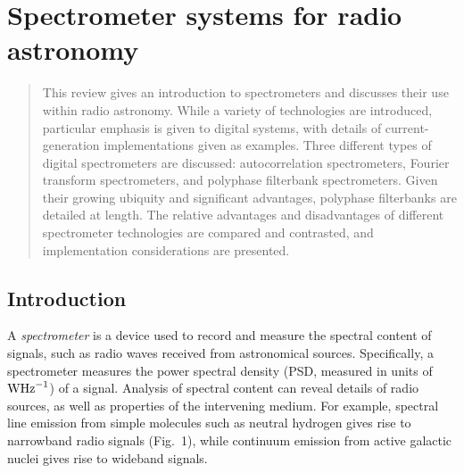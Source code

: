 \documentclass{ws-rv961x669}
\begin{document}
\chapter[Spectrometers]{Spectrometer systems for radio astronomy}\label{spec_chap}

\author[D. Price, J. Hickish and D. Werthimer]{Danny C. Price, Jack Hickish and Dan Werthimer}

\address{Campbell Hall 339, UC Berkeley\\
Address goes here, \\
dancpr@berkeley.edu}

\begin{abstract}
This review gives an introduction to spectrometers and discusses their use within radio astronomy. While a variety of technologies are introduced, particular emphasis is given to digital systems, with details of current-generation implementations given as examples. Three different types of digital spectrometers are discussed: autocorrelation spectrometers, Fourier transform spectrometers, and polyphase filterbank spectrometers.  Given their growing ubiquity and significant advantages, polyphase filterbanks are detailed at length. The relative advantages and disadvantages of different spectrometer technologies are compared and contrasted, and implementation considerations are presented.

\end{abstract}


\body

\section{Introduction}\label{introduction}

A \emph{spectrometer} is a device used to record and measure the spectral content of signals, such as radio waves received from astronomical sources. Specifically, a spectrometer measures the power spectral density (PSD, measured in units of $\rm{WHz}^{-1}$) of a signal. Analysis of spectral content can reveal details of radio sources, as well as properties of the intervening medium. For example, spectral line emission from simple molecules such as neutral hydrogen gives rise to narrowband radio signals (Fig.~1), while continuum emission from active galactic nuclei gives rise to wideband signals.
\end{document}
